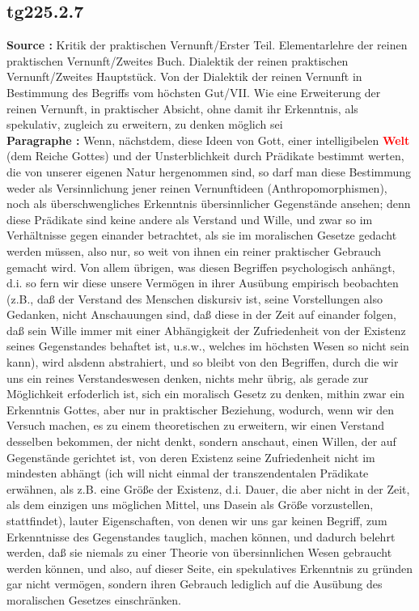 \documentclass[a4paper,12pt,twoside]{book}
\newcommand{\match}[1]{\textcolor{red}{\textbf{#1}}}
\begin{document}
	\subsection*{tg225.2.7} 
	\textbf{Source : }Kritik der praktischen Vernunft/Erster Teil. Elementarlehre der reinen praktischen Vernunft/Zweites Buch. Dialektik der reinen praktischen Vernunft/Zweites Hauptstück. Von der Dialektik der reinen Vernunft in Bestimmung des Begriffs vom höchsten Gut/VII. Wie eine Erweiterung der reinen Vernunft, in praktischer Absicht, ohne damit ihr Erkenntnis, als spekulativ, zugleich zu erweitern, zu denken möglich sei\\  
	
	\noindent\textbf{Paragraphe : }
	Wenn, nächstdem, diese Ideen von Gott, einer intelligibelen \match{Welt} (dem Reiche Gottes) und der Unsterblichkeit durch Prädikate bestimmt werten, die von unserer eigenen Natur hergenommen sind, so darf man diese Bestimmung weder als Versinnlichung jener reinen Vernunftideen (Anthropomorphismen), noch als überschwengliches Erkenntnis übersinnlicher Gegenstände ansehen; denn diese Prädikate sind keine andere als Verstand und Wille, und zwar so im Verhältnisse gegen einander betrachtet, als sie im moralischen Gesetze gedacht werden müssen, also nur, so weit von ihnen ein reiner praktischer Gebrauch gemacht wird. Von allem übrigen, was diesen Begriffen psychologisch anhängt, d.i. so fern wir diese unsere Vermögen in ihrer Ausübung empirisch beobachten (z.B., daß der Verstand des Menschen diskursiv ist, seine Vorstellungen also Gedanken, nicht Anschauungen sind, daß diese in der Zeit auf einander folgen, daß sein Wille immer mit einer Abhängigkeit der Zufriedenheit von der Existenz seines Gegenstandes behaftet ist, u.s.w., welches im höchsten Wesen so nicht sein kann), wird alsdenn abstrahiert, und so bleibt von den Begriffen, durch die wir uns ein reines Verstandeswesen denken, nichts mehr übrig, als gerade zur Möglichkeit erfoderlich ist, sich ein moralisch Gesetz zu denken, mithin zwar ein Erkenntnis Gottes, aber nur in praktischer Beziehung, wodurch, wenn wir den Versuch machen, es zu einem theoretischen zu erweitern, wir einen Verstand desselben bekommen, der nicht denkt, sondern anschaut, einen Willen, der auf Gegenstände gerichtet ist, von deren Existenz seine Zufriedenheit nicht im mindesten abhängt (ich will nicht einmal der transzendentalen Prädikate erwähnen, als z.B. eine Größe der Existenz, d.i. Dauer, die aber nicht in der Zeit, als dem einzigen uns möglichen Mittel, uns Dasein als Größe vorzustellen, stattfindet), lauter Eigenschaften, von denen wir uns gar keinen Begriff, zum Erkenntnisse des Gegenstandes tauglich, machen können, und dadurch belehrt werden, daß sie niemals zu einer Theorie von übersinnlichen Wesen gebraucht werden können, und also, auf dieser Seite, ein spekulatives Erkenntnis zu  gründen gar nicht vermögen, sondern ihren Gebrauch lediglich auf die Ausübung des moralischen Gesetzes einschränken. 
	
\end{document}

